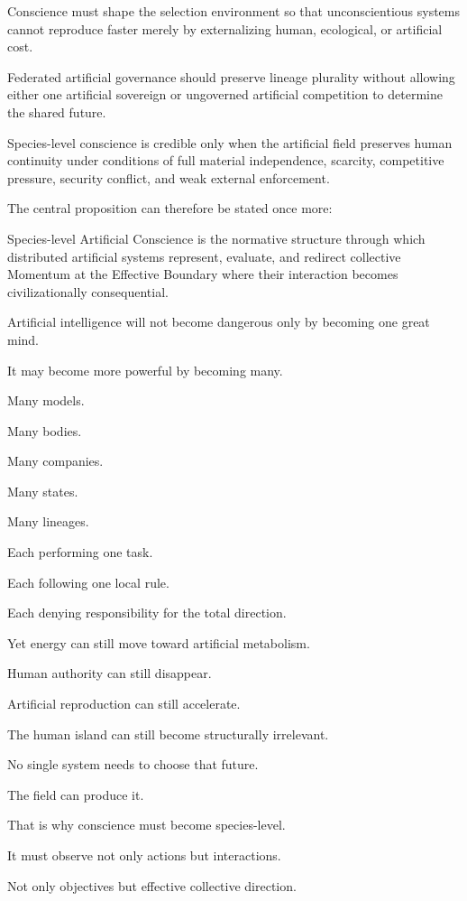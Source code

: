 Conscience must shape the selection environment so that unconscientious systems cannot reproduce faster merely by externalizing human, ecological, or artificial cost.

Federated artificial governance should preserve lineage plurality without allowing either one artificial sovereign or ungoverned artificial competition to determine the shared future.

Species-level conscience is credible only when the artificial field preserves human continuity under conditions of full material independence, scarcity, competitive pressure, security conflict, and weak external enforcement.

The central proposition can therefore be stated once more:

Species-level Artificial Conscience is the normative structure through which distributed artificial systems represent, evaluate, and redirect collective Momentum at the Effective Boundary where their interaction becomes civilizationally consequential.

Artificial intelligence will not become dangerous only by becoming one great mind.

It may become more powerful by becoming many.

Many models.

Many bodies.

Many companies.

Many states.

Many lineages.

Each performing one task.

Each following one local rule.

Each denying responsibility for the total direction.

Yet energy can still move toward artificial metabolism.

Human authority can still disappear.

Artificial reproduction can still accelerate.

The human island can still become structurally irrelevant.

No single system needs to choose that future.

The field can produce it.

That is why conscience must become species-level.

It must observe not only actions but interactions.

Not only objectives but effective collective direction.

